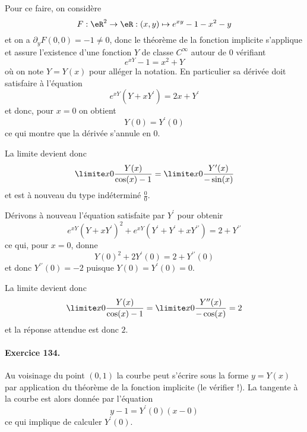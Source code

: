 Pour ce faire, on considère
\begin{equation*}
F : \eR^2 \to \eR : (x,y) \mapsto e^{xy} - 1 - x^2 - y
\end{equation*}
et on a $\partial_y F(0,0) = - 1 \neq 0$, donc le théorème de la
fonction implicite s'applique et assure l'existence d'une fonction $Y$
de classe $C^\infty$ autour de $0$ vérifiant
\begin{equation*}
e^{x Y} - 1 = x^2 + Y
\end{equation*}
où on note $Y = Y(x)$ pour alléger la notation. En particulier sa
dérivée doit satisfaire à l'équation
\begin{equation*}
e^{x Y} (Y + x Y^\prime) = 2 x + Y^\prime
\end{equation*}
et donc, pour $x = 0$ on obtient
\begin{equation*}
Y(0) = Y^\prime(0)
\end{equation*}
ce qui montre que la dérivée s'annule en $0$.

La limite devient donc
\begin{equation*}
\limite x 0 \frac{Y(x)}{\cos(x) - 1} = \limite x 0 \frac{Y^\prime(x)}{-\sin(x)}
\end{equation*}
et est à nouveau du type indéterminé \og $\frac00$\fg{}.

Dérivons à nouveau l'équation satisfaite par $Y^\prime$ pour obtenir
\begin{equation*}
e^{x Y} (Y + x Y^\prime)^2 + e^{x Y} (Y^\prime + Y^\prime + x
Y^{\prime\prime}) = 2 + Y^{\prime\prime}
\end{equation*}
ce qui, pour $x = 0$, donne
\begin{equation*}
Y(0)^2 + 2 Y^\prime(0) = 2 + Y^{\prime\prime}(0)
\end{equation*}
et donc $Y^{\prime\prime}(0) = -2$ puisque $Y(0) = Y^\prime(0) = 0$.

La limite devient donc
\begin{equation*}
\limite x 0 \frac{Y(x)}{\cos(x) - 1} = \limite x 0
\frac{Y^{\prime\prime}(x)}{-\cos(x)} = 2
\end{equation*}
et la réponse attendue est donc $2$.

\paragraph{Exercice 134.}
Au voisinage du point $(0,1)$ la courbe peut s'écrire sous la forme $y
= Y(x)$ par application du théorème de la fonction implicite (le
vérifier !). La tangente à la courbe est alors donnée par l'équation
\begin{equation*}
y - 1 = Y^\prime(0) (x - 0)
\end{equation*}
ce qui implique de calculer $Y^\prime(0)$.

